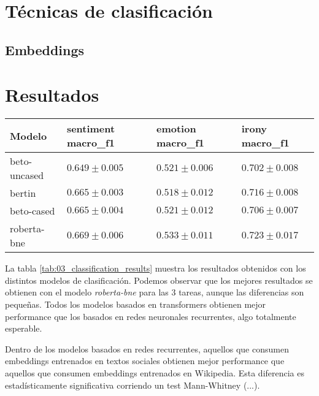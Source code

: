\section{Técnicas de clasificación}

\subsection{Embeddings}

\section{Resultados}

\begin{table*}[t]
    \centering
    \large
    \begin{tabular}{l lll}
        \toprule
        Modelo              & sentiment macro\_f1 & emotion macro\_f1 &  irony macro\_f1\\
        \hline
        beto-uncased        &     $0.649 \pm 0.005$ &   $0.521 \pm 0.006$ &  $0.702 \pm 0.008$   \\
        bertin              &     $0.665 \pm 0.003$ &   $0.518 \pm 0.012$ &  $0.716 \pm 0.008$   \\
        beto-cased          &     $0.665 \pm 0.004$ &   $0.521 \pm 0.012$ &  $0.706 \pm 0.007$   \\
        roberta-bne         &     $0.669 \pm 0.006$ &   $0.533 \pm 0.011$ &  $0.723 \pm 0.017$   \\
        \hline
    \end{tabular}
    \caption{Resultados de la evaluación de los distintos modelos para las 3 tareas analizadas (Análisis de Polaridad, Análisis de Emociones, Detección de Ironía). Los 3 resultados están dados en Macro F1, y expresados como la media de diez corridas junto a su desviación estándar}
    \label{tab:03_classification_results}
\end{table*}

La tabla \ref{tab:03_classification_results} muestra los resultados obtenidos con los distintos modelos de clasificación. Podemos observar que los mejores resultados se obtienen con el modelo \emph{roberta-bne} para las 3 tareas, aunque las diferencias son pequeñas. Todos los modelos basados en transformers obtienen mejor performance que los basados en redes neuronales recurrentes, algo totalmente esperable.

Dentro de los modelos basados en redes recurrentes, aquellos que consumen embeddings entrenados en textos sociales obtienen mejor performance que aquellos que consumen embeddings entrenados en Wikipedia. Esta diferencia es estadísticamente significativa corriendo un test Mann-Whitney (...).

